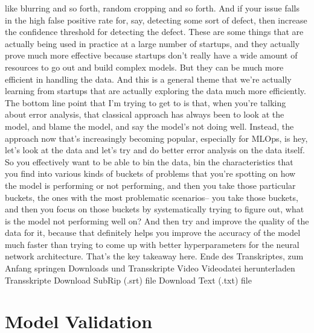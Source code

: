 {{    like blurring and so forth, random cropping and so forth.
    And if your issue falls in the high false positive rate for,
    say, detecting some sort of defect, then increase the confidence threshold
    for detecting the defect.
    These are some things that are actually being
    used in practice at a large number of startups,
    and they actually prove much more effective because startups don't really
    have a wide amount of resources to go out and build complex models.
    But they can be much more efficient in handling the data.
    And this is a general theme that we're actually
    learning from startups that are actually exploring the data much more
    efficiently.
    The bottom line point that I'm trying to get to
    is that, when you're talking about error analysis, that classical approach has
    always been to look at the model, and blame the model,
    and say the model's not doing well.
    Instead, the approach now that's increasingly becoming popular,
    especially for MLOps, is hey, let's look at the data
    and let's try and do better error analysis on the data itself.
    So you effectively want to be able to bin the data, bin the characteristics
    that you find into various kinds of buckets of problems
    that you're spotting on how the model is performing or not performing,
    and then you take those particular buckets, the ones with the most
    problematic scenarios-- you take those buckets,
    and then you focus on those buckets by systematically trying to figure out,
    what is the model not performing well on?
    And then try and improve the quality of the data for it,
    because that definitely helps you improve the accuracy of the model
    much faster than trying to come up with better hyperparameters
    for the neural network architecture.
    That's the key takeaway here.
    Ende des Transkriptes, zum Anfang springen
    Downloads und Transskripte
    Video
    Videodatei herunterladen
    Transskripte
    Download SubRip (.srt) file
    Download Text (.txt) file    
    
\section{Model Validation}


}}

